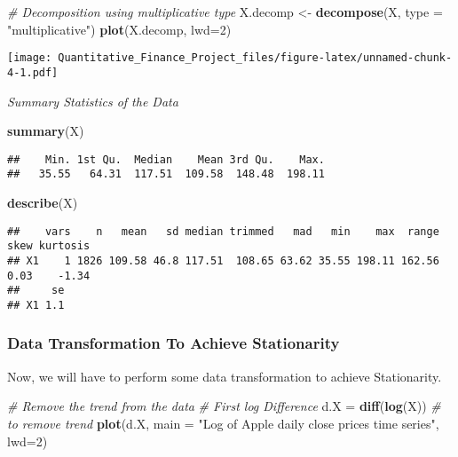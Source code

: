 \documentclass[
]{article}
\newenvironment{Shaded}{\begin{snugshade}}{\end{snugshade}}
\newcommand{\AttributeTok}[1]{\textcolor[rgb]{0.13,0.29,0.53}{#1}}
\newcommand{\CommentTok}[1]{\textcolor[rgb]{0.56,0.35,0.01}{\textit{#1}}}
\newcommand{\DecValTok}[1]{\textcolor[rgb]{0.00,0.00,0.81}{#1}}
\newcommand{\FunctionTok}[1]{\textcolor[rgb]{0.13,0.29,0.53}{\textbf{#1}}}
\newcommand{\NormalTok}[1]{#1}
\newcommand{\OtherTok}[1]{\textcolor[rgb]{0.56,0.35,0.01}{#1}}
\newcommand{\StringTok}[1]{\textcolor[rgb]{0.31,0.60,0.02}{#1}}
\begin{document}
\begin{Shaded}
\begin{Highlighting}[]
\CommentTok{\# Decomposition using multiplicative type }
\NormalTok{X.decomp }\OtherTok{\textless{}{-}} \FunctionTok{decompose}\NormalTok{(X, }\AttributeTok{type =} \StringTok{"multiplicative"}\NormalTok{)}
\FunctionTok{plot}\NormalTok{(X.decomp, }\AttributeTok{lwd=}\DecValTok{2}\NormalTok{)}
\end{Highlighting}
\end{Shaded}

\texttt{[image: Quantitative\_Finance\_Project\_files/figure-latex/unnamed-chunk-4-1.pdf]}

\emph{Summary Statistics of the Data}

\begin{Shaded}
\begin{Highlighting}[]
\FunctionTok{summary}\NormalTok{(X)}
\end{Highlighting}
\end{Shaded}

\begin{verbatim}
##    Min. 1st Qu.  Median    Mean 3rd Qu.    Max. 
##   35.55   64.31  117.51  109.58  148.48  198.11
\end{verbatim}

\begin{Shaded}
\begin{Highlighting}[]
\FunctionTok{describe}\NormalTok{(X)}
\end{Highlighting}
\end{Shaded}

\begin{verbatim}
##    vars    n   mean   sd median trimmed   mad   min    max  range skew kurtosis
## X1    1 1826 109.58 46.8 117.51  108.65 63.62 35.55 198.11 162.56 0.03    -1.34
##     se
## X1 1.1
\end{verbatim}

\hypertarget{data-transformation-to-achieve-stationarity}{%
\subsubsection{Data Transformation To Achieve
Stationarity}\label{data-transformation-to-achieve-stationarity}}

Now, we will have to perform some data transformation to achieve
Stationarity.

\begin{Shaded}
\begin{Highlighting}[]
\CommentTok{\# Remove the trend from the data}
\CommentTok{\# First log Difference}
\NormalTok{d.X }\OtherTok{=} \FunctionTok{diff}\NormalTok{(}\FunctionTok{log}\NormalTok{(X)) }\CommentTok{\# to remove trend}
\FunctionTok{plot}\NormalTok{(d.X, }\AttributeTok{main =} \StringTok{"Log of Apple daily close prices time series"}\NormalTok{, }\AttributeTok{lwd=}\DecValTok{2}\NormalTok{)}
\end{Highlighting}
\end{Shaded}
\end{document}
